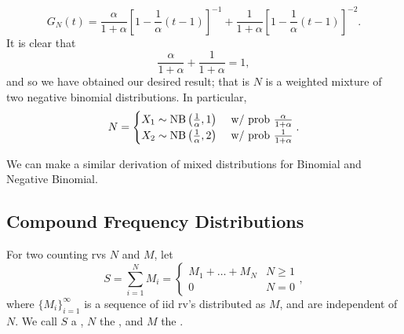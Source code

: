 \documentclass[notoc,notitlepage]{tufte-book}
\begin{document}
\begin{solution}
\begin{equation*}
    G_N(t) = \frac{\alpha}{1 + \alpha} \left[ 1 - \frac{1}{\alpha} (t - 1) \right]^{-1} + \frac{1}{1 + \alpha} \left[ 1 - \frac{1}{\alpha} ( t - 1 ) \right]^{-2}.
  \end{equation*}
  It is clear that
  \begin{equation*}
    \frac{\alpha}{1 + \alpha} + \frac{1}{1 + \alpha} = 1,
  \end{equation*}
  and so we have obtained our desired result; that is $N$ is a weighted mixture of two negative binomial distributions. In particular,
  \begin{equation*}
    N = \begin{cases}
      X_1 \sim \operatorname{NB} \left( \frac{1}{\alpha}, 1 \right) & \text{ w/ prob } \frac{\alpha}{1 + \alpha} \\
      X_2 \sim \operatorname{NB} \left( \frac{1}{\alpha}, 2 \right) & \text{ w/ prob } \frac{1}{1 + \alpha}
    \end{cases}.
  \end{equation*}
\end{solution}


We can make a similar derivation of mixed distributions for Binomial and Negative Binomial.


\subsection{Compound Frequency Distributions}%
\label{sub:compound_frequency_distributions}

\begin{defn}\label{defn:compound_frequency_distribution}
  For two counting rvs $N$ and $M$, let
  \begin{equation*}
    S = \sum_{i=1}^{N} M_i = \begin{cases}
      M_1 + \hdots + M_N & N \geq 1 \\
      0                  & N = 0
    \end{cases},
  \end{equation*}
  where $\{ M_i \}_{i = 1}^{\infty}$ is a sequence of iid rv's distributed as $M$, and are independent of $N$. We call $S$ a , $N$ the , and $M$ the .
\end{defn}
\end{document}
